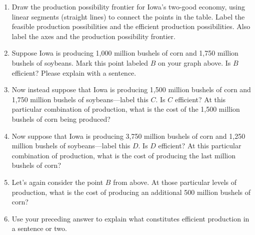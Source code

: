 \documentclass{assignment}
\begin{document}
\begin{enumerate}

\item Draw the production possibility frontier for Iowa's two-good economy, using linear segments (straight lines) to connect the points in the table. Label the feasible production possibilities and the efficient production possibilities. Also label the axes and the production possibility frontier.

\begin{center}
\end{center}

\item Suppose Iowa is producing 1,000 million bushels of corn and 1,750 million bushels of soybeans. Mark this point labeled $B$ on your graph above. Is $B$ efficient? Please explain with a sentence.


\vfill

\item Now instead suppose that Iowa is producing 1,500 million bushels of corn and 1,750 million bushels of soybeans---label this $C$. Is $C$ efficient? At this particular combination of production, what is the cost of the 1,500 million bushels of corn being produced?

\vfill

\item Now suppose that Iowa is producing 3,750 million bushels of corn and 1,250 million bushels of soybeans---label this $D.$ Is $D$ efficient? At this particular combination of production, what is the cost of producing the last million bushels of corn?

\vfill

\item Let's again consider the point $B$ from above. At those particular levels of production, what is the cost of producing an additional 500 million bushels of corn?

\vfill

\item Use your preceding answer to explain what constitutes efficient production in a sentence or two.

\vfill

\vspace{-4\baselineskip}

\end{enumerate}
\end{document}
